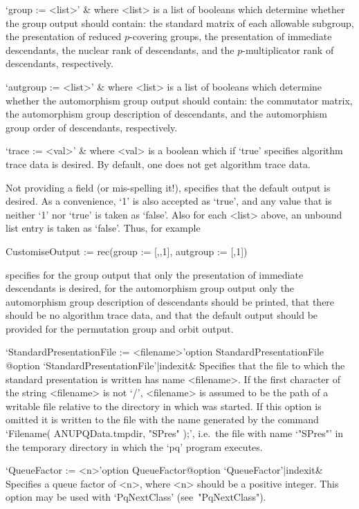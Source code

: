 \quad`group := <list>' &
where <list> is a list of booleans  which  determine  whether  the  group
output should contain: the standard matrix of  each  allowable  subgroup,
the presentation of reduced  $p$-covering  groups,  the  presentation  of
immediate  descendants,  the  nuclear  rank  of  descendants,   and   the
$p$-multiplicator rank of descendants, respectively.

\quad`autgroup := <list>' &
where  <list>  is  a  list  of  booleans  which  determine  whether   the
automorphism group output should  contain:  the  commutator  matrix,  the
automorphism group description of descendants, and the automorphism group
order of descendants, respectively.

\quad`trace := <val>' &
where <val> is a boolean which if `true' specifies algorithm  trace  data
is desired. By default, one does not get algorithm trace data.

Not providing a field (or mis-spelling it!), specifies that  the  default
output is desired. As a convenience, `1' is also accepted as `true',  and
any value that is neither `1' nor `true' is taken as  `false'.  Also  for
each <list> above, an unbound list entry is taken as `false'.  Thus,  for
example

\begintt
CustomiseOutput := rec(group := [,,1], autgroup := [,1])
\endtt

specifies for the group output that only the  presentation  of  immediate
descendants is desired,  for  the  automorphism  group  output  only  the
automorphism group description of descendants  should  be  printed,  that
there should be no algorithm trace data,  and  that  the  default  output
should be provided for the permutation group and orbit output.

\>`StandardPresentationFile := <filename>'{option StandardPresentationFile}%
@{option `StandardPresentationFile'|indexit}&
Specifies that the file to which the standard presentation is written has
name <filename>. If the first character of the string <filename>  is  not
`/', <filename> is assumed to be the path of a writable file relative  to
the directory in which {\GAP} was started. If this option is  omitted  it
is written to the file with the name generated by the command  `Filename(
ANUPQData.tmpdir, "SPres" );', i.e.~the file with name `"SPres"'  in  the
temporary directory in which the `pq' program executes.

\>`QueueFactor := <n>'{option QueueFactor}@{option `QueueFactor'|indexit}&
Specifies a queue factor of <n>, where <n> should be a positive  integer.
This option may be used with `PqNextClass' (see~"PqNextClass").

